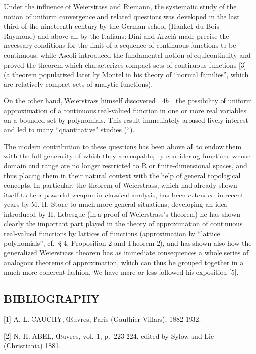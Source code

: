 Under the influence of Weierstrass and Riemann, the systematic study of the notion of uniform convergence and related questions was developed in the last third of the nineteenth century by the German school (Hankel, du Bois-Raymond) and above all by the Italians; Dini and Arzelà made precise the necessary conditions for the limit of a sequence of continuous functions to be continuous, while Ascoli introduced the fundamental notion of equicontinuity and proved the theorem which characterizes compact sets of continuous functions {[}3{]} (a theorem popularized later by Montel in his theory of ``normal families'', which are relatively compact sets of analytic functions).

On the other hand, Weierstrass himself discovered \([4b]\) the possibility of uniform approximation of a continuous real-valued function in one or more real variables on a bounded set by polynomials. This result immediately aroused lively interest and led to many ``quantitative'' studies (*).

The modern contribution to these questions has been above all to endow them with the full generality of which they are capable, by considering functions whose domain and range are no longer restricted to R or finite-dimensional spaces, and thus placing them in their natural context with the help of general topological concepts. In particular, the theorem of Weierstrass, which had already shown itself to be a powerful weapon in classical analysis, has been extended in recent years by M. H. Stone to much more general situations; developing an idea introduced by H. Lebesgue (in a proof of Weierstrass's theorem) he has shown clearly the important part played in the theory of approximation of continuous real-valued functions by lattices of functions (approximation by ``lattice polynomials'', cf.~§ 4, Proposition 2 and Theorem 2), and has shown also how the generalized Weierstrass theorem has as immediate consequences a whole series of analogous theorems of approximation, which can thus be grouped together in a much more coherent fashion. We have more or less followed his exposition {[}5{]}.

\subsection*{BIBLIOGRAPHY}

{[}1{]} A.-L. CAUCHY, Œuvres, Paris (Gauthier-Villars), 1882-1932.

{[}2{]} N. H. ABEL, Œuvres, vol.~1, p.~223-224, edited by Sylow and Lie (Christiania) 1881.

